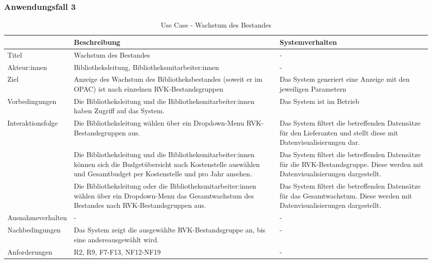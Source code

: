\subsubsection{Anwendungsfall 3}

\begingroup
\setlength{\tabcolsep}{10pt} %
\renewcommand{\arraystretch}{1.25} 
\begin{table}[H]
    \centering
    \begin{adjustbox}{max width=\textwidth}
    \begin{tabular}{lp{6.5cm}p{6.5cm}}
       \toprule
       \textbf{}          & \textbf{Beschreibung} &\textbf{Systemverhalten}\\
       \midrule
        Titel                            &Wachstum des Bestandes& -\\
        Akteur:innen                     &Bibliotheksleitung, Bibliotheksmitarbeiter:innen & -\\
        Ziel                             &Anzeige des Wachstum des Bibliotheksbestandes (soweit er im OPAC) ist nach einzelnen RVK-Bestandsgruppen & Das System generiert eine Anzeige mit den jeweiligen Parametern\\
        Vorbedingungen                   &Die Bibliotheksleitung und die Bibliotheksmitarbeiter:innen haben Zugriff auf das System.& Das System ist im Betrieb\\
        Interaktionsfolge                &Die Bibliotheksleitung wählen über ein Dropdown-Menu RVK-Bestandsgruppen aus. & Das System filtert die betreffenden Datensätze für den Lieferanten und stellt diese mit Datenvisualisierungen dar.\\
                                        &Die Bibliotheksleitung und die Bibliotheksmitarbeiter:innen können sich die Budgetübersicht nach Kostenstelle auswählen und Gesamtbudget per Kostenstelle und pro Jahr ansehen.& Das System filtert die betreffenden Datensätze für die RVK-Bestandsgruppe. Diese werden mit Datenvisualisierungen dargestellt.\\
                                        &Die Bibliotheksleitung oder die Bibliotheksmitarbeiter:innen wählen über ein Dropdown-Menu das Gesamtwachstum des Bestandes nach RVK-Bestandsgruppen aus.&Das System filtert die betreffenden Datensätze für das Gesamtwachstum. Diese werden mit Datenvisualisierungen dargestellt.\\

        Ausnahmeverhalten               &- & -\\
        Nachbedingungen                 &Das System zeigt die ausgewählte RVK-Bestandsgruppe an, bis eine andereausgewählt wird. & -\\

        Anforderungen                   &R2, R9, F7-F13, NF12-NF19& -\\
        \bottomrule
    \end{tabular}
    \end{adjustbox}
    \caption{%
    Use Case - Wachstum des Bestandes
    }
    \label{tab:UC_budget}
    \end{table}
\endgroup


